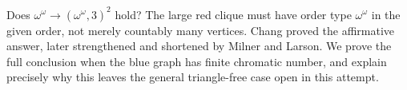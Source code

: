 Does $\omega^\omega\to(\omega^\omega,3)^2$ hold? The large red clique must have order type $\omega^\omega$ in the given order, not merely countably many vertices. Chang proved the affirmative answer, later strengthened and shortened by Milner and Larson. We prove the full conclusion when the blue graph has finite chromatic number, and explain precisely why this leaves the general triangle-free case open in this attempt.
